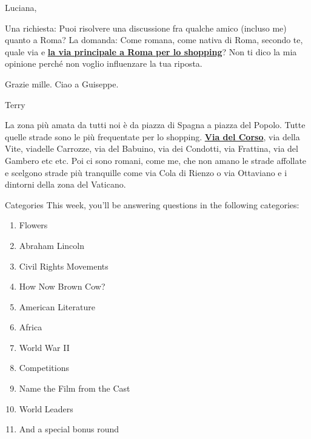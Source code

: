 \documentclass[11pt]{beamer}
\begin{document}
\begingroup{}
\begin{frame}{}
\hfill{}\begin{minipage}{0.9\textwidth}
\begin{mdframed}[
    roundcorner=7pt,
    backgroundcolor=blue!80!white,
    linecolor=blue!80!white,
    fontcolor=white,
    ignorelastdescenders]
\begin{flushleft}
{\small{}\selectfont{}
Luciana,

Una richiesta: Puoi risolvere una discussione fra qualche amico (incluso me) quanto a
Roma? La domanda: Come romana, come nativa di Roma, secondo te, quale via e
\ul{\textbf{la via principale a Roma per lo shopping}}?
Non ti dico la mia opinione perché non voglio influenzare la tua riposta.

Grazie mille. Ciao a Guiseppe.

Terry
}
\end{flushleft}
\end{mdframed}
\end{minipage}

\begin{minipage}{0.9\textwidth}
\begin{mdframed}[
    roundcorner=7pt,
    backgroundcolor=black!5,
    linecolor=black!5,
    fontcolor=black,
    ignorelastdescenders]
\begin{flushleft}
{\small{}\selectfont{}
La zona più amata da tutti noi è da piazza di Spagna a piazza del Popolo. Tutte quelle
strade sono le più frequentate per lo shopping.
\ul{\textbf{Via del Corso}},
via della Vite, viadelle Carrozze, via del Babuino, via dei Condotti, via
Frattina, via del Gambero etc etc. Poi ci sono romani, come me, che non amano le strade
affollate e scelgono strade più tranquille come via Cola di Rienzo o via Ottaviano e i
dintorni della zona del Vaticano.
}
\end{flushleft}
\end{mdframed}
\end{minipage}
\end{frame}


\begingroup{}
\begin{frame}[t]{Categories}
This week, you'll be answering questions in the following categories:
\begin{enumerate}
\item Flowers
\item Abraham Lincoln
\item Civil Rights Movements
\item How Now Brown Cow?
\item American Literature
\item Africa
\item World War II
\item Competitions
\item Name the Film from the Cast
\item World Leaders
\item And a special bonus round
\end{enumerate}
\end{frame}
\endgroup{}
\end{document}
